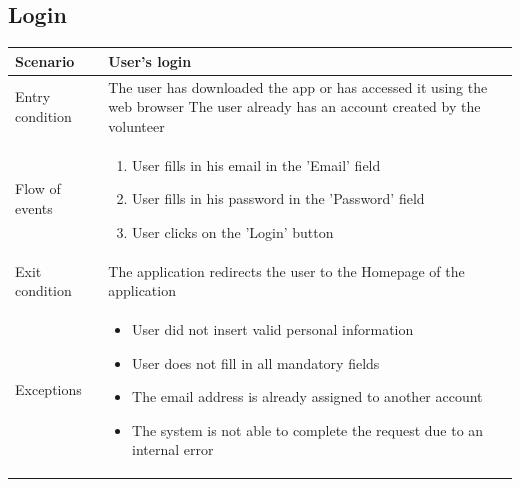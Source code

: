 \documentclass[12pt,a4paper,twoside,openright,titlepage]{book}
\begin{document}
\subsection{Login}
\begin{table}[H]
\centering
\begin{tabular}{|p{3cm}|p{10.5cm}|}
\hline
Scenario & User's login \\
\hline
Entry condition & The user has downloaded the app or has accessed it using the web browser \newline
The user already has an account created by the volunteer \\
\hline
Flow of events & 
\begin{enumerate}
\item User fills in his email in the 'Email' field
\item User fills in his password in the 'Password' field
\item User clicks on the 'Login' button
\end{enumerate}\\
\hline
Exit condition & The application redirects the user to the Homepage of the application \\
\hline
Exceptions & 
\begin{itemize}
\item User did not insert valid personal information
\item User does not fill in all mandatory fields
\item The email address is already assigned to another account
\item The system is not able to complete the request due to an internal error
\end{itemize} \\
\hline
\end{tabular}
\end{table}
\end{document}
